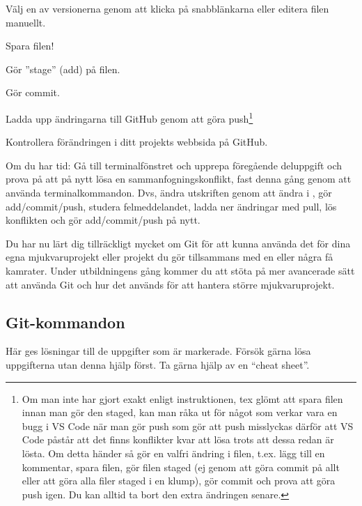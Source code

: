 \begin{Datorarbete}
	\begin{Deluppgifter}
		\item Välj en av versionerna genom att klicka på snabblänkarna eller editera filen manuellt.
		\item Spara filen!
		\item Gör ''stage'' (add) på filen.
		\item Gör commit.
		\item Ladda upp ändringarna till GitHub genom att göra push\footnote{Om man inte har gjort exakt enligt instruktionen, tex glömt att spara filen innan man gör den staged, kan man råka ut för något som verkar vara en bugg i VS Code när man gör push som gör att push misslyckas därför att VS Code påstår att det finns konflikter kvar att lösa trots att dessa redan är lösta. Om detta händer så gör en valfri ändring i filen, t.ex. lägg till en kommentar, spara filen, gör filen staged (ej genom att göra commit på allt eller att göra alla filer staged i en klump), gör commit och prova att göra push igen. Du kan alltid ta bort den extra ändringen senare.}
		\item Kontrollera förändringen i ditt projekts webbsida på GitHub.
	\end{Deluppgifter}

	\item Om du har tid: Gå till terminalfönstret och upprepa föregående deluppgift och prova på att på nytt lösa en sammanfogningskonflikt, fast denna gång genom att använda terminalkommandon. Dvs, ändra utskriften genom att ändra  i , gör add/commit/push, studera felmeddelandet, ladda ner ändringar med pull, lös konflikten och gör add/commit/push på nytt.


\end{Datorarbete}


Du har nu lärt dig tillräckligt mycket om Git för att kunna använda det för dina egna mjukvaruprojekt eller projekt du gör tillsammans med en eller några få kamrater. Under utbildningens gång kommer du att stöta på mer avancerade sätt att använda Git och hur det används för att hantera större mjukvaruprojekt.




\newpage

\subsection*{Git-kommandon}
Här ges lösningar till de uppgifter som är markerade. Försök gärna lösa uppgifterna utan denna hjälp först. Ta gärna hjälp av en ``cheat sheet''.

